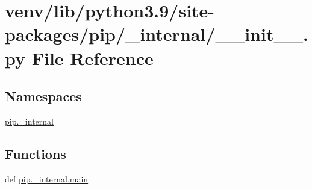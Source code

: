 \hypertarget{venv_2lib_2python3_89_2site-packages_2pip_2__internal_2____init_____8py}{}\section{venv/lib/python3.9/site-\/packages/pip/\+\_\+internal/\+\_\+\+\_\+init\+\_\+\+\_\+.py File Reference}
\label{venv_2lib_2python3_89_2site-packages_2pip_2__internal_2____init_____8py}
\subsection*{Namespaces}
\begin{DoxyCompactItemize}
\item 
 \hyperlink{namespacepip_1_1__internal}{pip.\+\_\+internal}
\end{DoxyCompactItemize}
\subsection*{Functions}
\begin{DoxyCompactItemize}
\item 
def \hyperlink{namespacepip_1_1__internal_af45dd17747a42e9a88101c77858cf019}{pip.\+\_\+internal.\+main}
\end{DoxyCompactItemize}
